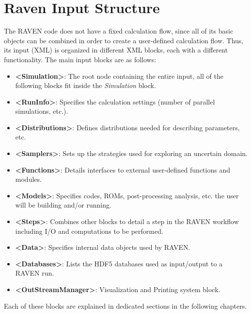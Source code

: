 \section{Raven Input Structure}
The RAVEN code does not have a fixed calculation flow, since all of its basic
objects can be combined in order to create a user-defined calculation flow.
%
Thus, its input (XML) is organized in different XML blocks, each with a
different functionality.
%
The main input blocks are as follows:
\begin{itemize}
\item \textbf{\textless Simulation\textgreater}: The root node containing the entire input, all of
  the following blocks fit inside the \emph{Simulation} block. 
\item \textbf{\textless RunInfo\textgreater}: Specifies the calculation settings (number of parallel
  simulations, etc.).
\item \textbf{\textless Distributions\textgreater}: Defines distributions needed for describing
  parameters, etc.
\item \textbf{\textless Samplers\textgreater}: Sets up the strategies used for exploring an uncertain
  domain.
\item \textbf{\textless Functions\textgreater}: Details interfaces to external user-defined functions
  and modules.
\item \textbf{\textless Models\textgreater}: Specifies codes, ROMs, post-processing analysis, etc.
  the user will be building and/or running.
\item \textbf{\textless Steps\textgreater}: Combines other blocks to detail a step in the RAVEN
  workflow including I/O and computations to be performed.
\item \textbf{\textless Data\textgreater}: Specifies internal data objects used by RAVEN.
\item \textbf{\textless Databases\textgreater}: Lists the HDF5 databases used as input/output to a
  RAVEN run.
\item \textbf{\textless OutStreamManager\textgreater}: Visualization and Printing system block.
\end{itemize}

Each of these blocks are explained in dedicated sections in the following
chapters.
